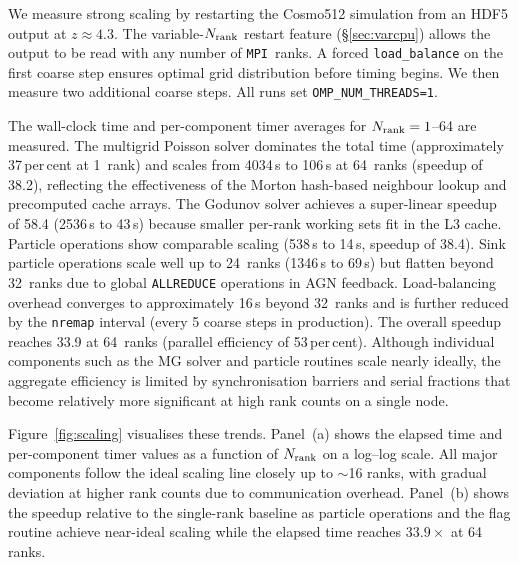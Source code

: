 \documentclass[fleqn,usenatbib]{mnras}
\newcommand{\nrank}{N_{\rm rank}}
\newcommand{\code}[1]{\texttt{#1}}
\newcommand{\mpi}[0]{\texttt{MPI}}
\begin{document}
We measure strong scaling by restarting the Cosmo512 simulation
from an HDF5 output at $z \approx 4.3$.  The variable-$\nrank$ restart feature (\S\ref{sec:varcpu}) allows the
output to be read with any number of \mpi\ ranks. A forced
\code{load\_balance} on the first coarse step ensures optimal grid
distribution before timing begins. We then measure two additional
coarse steps. All runs set \code{OMP\_NUM\_THREADS=1}.

The wall-clock time and per-component timer averages for $\nrank = 1$--64
are measured.  The multigrid Poisson solver dominates the total time
(approximately 37\,per\,cent at 1~rank) and scales from 4034\,s to
106\,s at 64~ranks (speedup of 38.2), reflecting the effectiveness of
the Morton hash-based neighbour lookup and precomputed cache arrays.
The Godunov solver achieves a super-linear speedup of 58.4 (2536\,s to
43\,s) because smaller per-rank working sets fit in the L3 cache.
Particle operations show comparable scaling (538\,s to 14\,s, speedup
of 38.4).  Sink particle operations scale well up to 24~ranks (1346\,s
to 69\,s) but flatten beyond 32~ranks due to global \code{ALLREDUCE}
operations in AGN feedback.  Load-balancing overhead converges to
approximately 16\,s beyond 32~ranks and is further reduced by the
\code{nremap} interval (every 5 coarse steps in production).  The
overall speedup reaches 33.9 at 64~ranks (parallel efficiency of
53\,per\,cent).  Although individual components such as the MG solver
and particle routines scale nearly ideally, the aggregate efficiency is
limited by synchronisation barriers and serial fractions that become
relatively more significant at high rank counts on a single node.

Figure~\ref{fig:scaling} visualises these trends.  Panel~(a) shows the
elapsed time and per-component timer values as a function of $\nrank$
on a log--log scale.  All major components follow the ideal scaling
line closely up to $\sim$16 ranks, with gradual deviation at higher
rank counts due to communication overhead.
Panel~(b) shows the speedup relative to the single-rank baseline as
particle operations and the flag routine achieve near-ideal scaling
while the elapsed time reaches $33.9\times$ at 64 ranks.
\end{document}

